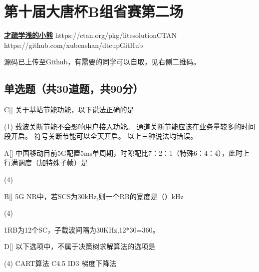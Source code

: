 \chapter{第十届大唐杯B组省赛第二场}
\fancyhead[R]{\color{H6}\kaishu\rightmark\,}

\date{2023年4月15日}{}{\href{https://github.com/xubenshan/dtcup}{\textbf{才疏学浅的小熊}}}
{}
{https://ctan.org/pkg/litesolution}{CTAN}
{https://github.com/xubenshan/dtcup}{GitHub}

源码已上传至Github，有需要的同学可以自取，见右侧二维码。

\section{单选题（共30道题，共90分）}



\begin{choice}{C}[]
    关于基站节能功能，以下说法正确的是
    \begin{tasks}(1)
        \task 载波关断节能不会影响用户接入功能。
        \task 通道关断节能应该在业务量较多的时间段开启。
        \task 符号关断节能可以全天开启。
        \task 以上三种说法均错误。
    \end{tasks}
\end{choice}


\begin{choice}{A}[]
    中国移动目前5G配置5ms单周期，时隙配比7：2：1（特殊6：4：4），此时上行满调度（加特殊子帧）是
    \begin{tasks}(4)
    \end{tasks}
\end{choice}




\begin{choice}{B}[]
    5G NR中，若SCS为30kHz,则一个RB的宽度是（\qquad）kHz
    \begin{tasks}(4)
    \end{tasks}
\end{choice}
\begin{solution}
    1RB为12个SC，子载波间隔为30KHz,12*30=360。
\end{solution}



\begin{choice}{D}[]
    以下选项中，不属于决策树求解算法的选项是
    \begin{tasks}(4)
        \task CART算法
        \task C4.5
        \task ID3
        \task 梯度下降法
    \end{tasks}
\end{choice}

